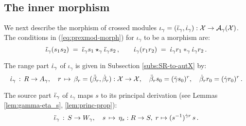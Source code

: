 \subsection{The inner morphism}
\label{subs:inner-morphism}

We next describe the morphism of crossed modules
$\iota_{\gamma} = (\ddot{\iota}_{\gamma},\dot{\iota}_{\gamma}) 
 : \mathcal{X} \to \mathcal{A}_{\gamma}(\mathcal{X})$. 
The conditions in (\ref{eq:prexmod-morph}) 
for $\iota_{\gamma}$ to be a morphism are: 
\begin{equation} \label{eq:6}
\ddot{\iota}_{\gamma}(s_1s_2) 
\;=\; \ddot{\iota}_{\gamma} s_1 \star_{\gamma} \ddot{\iota}_{\gamma} s_2\,,
\quad\quad 
\dot{\iota}_{\gamma}(r_1r_2) \;=\; \dot{\iota}_{\gamma} r_1 \ast_{\gamma} \dot{\iota}_{\gamma} r_2\,.
\end{equation}

\noindent
The range part  $\dot{\iota}_{\gamma}$  of  $\iota_{\gamma}$  
is given in Subsection \ref{subs:SR-to-autX} by: 
$$
\dot{\iota}_{\gamma} \,:\, R \to A_{\gamma}, \quad
r \,\mapsto\, \beta_r = (\ddot{\beta}_r,\dot{\beta}_r) : \mathcal{X} \to \mathcal{X},
\quad \ddot{\beta}_r s_0 = (\ddot{\gamma} s_0)^r,
\quad  \dot{\beta}_r r_0 = (\dot{\gamma} r_0)^r\,.
$$

\noindent
The source part  $\ddot{\iota}_{\gamma}$  of $\iota_{\gamma}$  
maps $s$ to its principal derivation 
(see Lemmas \ref{lem:gamma-eta_s}, \ref{lem:princ-prop}): 
$$
\ddot{\iota}_{\gamma} \,:\, S \to W_{\gamma}, \quad 
s \,\mapsto\, \eta_s : R \to S,\; r \mapsto (s^{-1})^{\dot{\gamma} r}\,s\,.
$$

